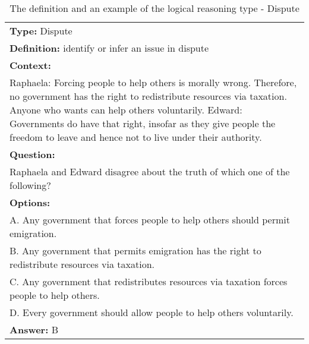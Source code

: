 \documentclass{article} \usepackage{iclr2020_conference,times}
\begin{document}
\begin{table}
	\small
	\centering
	\caption{The definition and an example of the logical reasoning type - Dispute}
	\begin{tabular}{|p{}|}
		\hline
		{\bf Type: }Dispute \\
		
		{\bf Definition: }identify or infer an issue in dispute
		\\
		\hline
		{\bf Context:} \\Raphaela: Forcing people to help others is morally wrong. Therefore, no government has the right to redistribute resources via taxation. Anyone who wants can help others voluntarily. Edward: Governments do have that right, insofar as they give people the freedom to leave and hence not to live under their authority.
		\\
		{\bf Question:}\\Raphaela and Edward disagree about the truth of which one of the following?\\
		{\bf Options:}\\
			A. Any government that forces people to help others should permit emigration.\\
			B. Any government that permits emigration has the right to redistribute resources via taxation.\\
			C. Any government that redistributes resources via taxation forces people to help others.\\
			D. Every government should allow people to help others voluntarily.\\
		{\bf Answer: } B\\
		\hline
	\end{tabular}
	\label{tab:dispute}
\end{table}
\end{document}
